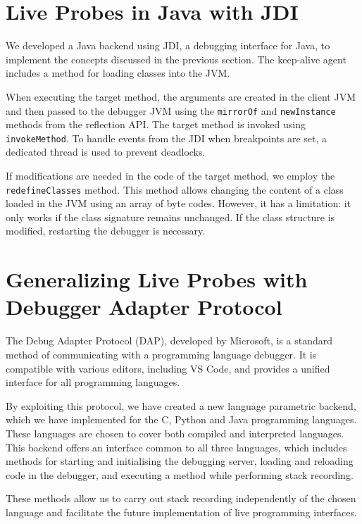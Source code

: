 \documentclass[english,submission]{programming}
\newcommand{\code}[1]{\colorbox{codegray}{\texttt{#1}}}
\begin{document}
\section{Live Probes in Java with JDI}
\label{sec:live-probes-java}

We developed a Java backend using JDI, a debugging interface for Java, to implement the concepts discussed in the previous section. 
The keep-alive agent includes a method for loading classes into the JVM.

When executing the target method, the arguments are created in the client JVM and then passed to the debugger JVM using the \code{mirrorOf} and \code{newInstance} methods from the reflection API. 
The target method is invoked using \code{invokeMethod}. 
To handle events from the JDI when breakpoints are set, a dedicated thread is used to prevent deadlocks.

If modifications are needed in the code of the target method, we employ the \code{redefineClasses} method. 
This method allows changing the content of a class loaded in the JVM using an array of byte codes. 
However, it has a limitation: it only works if the class signature remains unchanged. 
If the class structure is modified, restarting the debugger is necessary.

\section{Generalizing Live Probes with Debugger Adapter Protocol}
\label{sec:generalizing-live-probes}
The Debug Adapter Protocol (DAP), developed by Microsoft, is a standard method of communicating with a programming language debugger. It is compatible with various editors, including VS Code, and provides a unified interface for all programming languages. 

By exploiting this protocol, we have created a new language parametric backend, which we have implemented for the C, Python and Java programming languages. These languages are chosen to cover both compiled and interpreted languages. 
This backend offers an interface common to all three languages, which includes methods for starting and initialising the debugging server, loading and reloading code in the debugger, and executing a method while performing stack recording. 

These methods allow us to carry out stack recording independently of the chosen language and facilitate the future implementation of live programming interfaces. 
\end{document}
